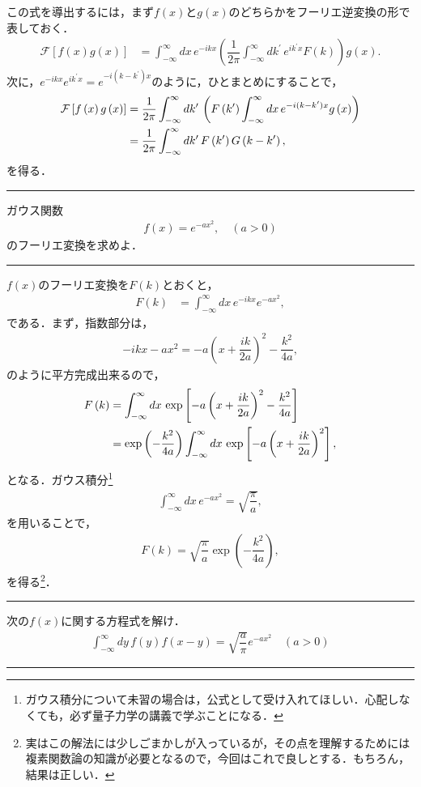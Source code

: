 この式を導出するには，まず$f(x)$と$g(x)$のどちらかをフーリエ逆変換の形で表しておく．
\begin{align}
  \mathcal{F}\left[f\left(x\right)g\left(x\right)\right]
  &= \int_{-\infty}^{\infty}dx\,e^{-ikx}\left(\dfrac{1}{2\pi}\int_{-\infty}^{\infty}dk^{\prime}\,e^{ik^{\prime}x}F\left(k\right)\right)g\left(x\right). 
\end{align}
次に，$e^{-ikx}e^{ik^{\prime}x} = e^{-i(k-k^{\prime})x}$のように，ひとまとめにすることで，
\begin{align}
  \mathcal{F}\left[f\left(x\right)g\left(x\right)\right]
  &= \dfrac{1}{2\pi}\int_{-\infty}^{\infty}dk^{\prime}\,\left(F\left(k^{\prime}\right)\int_{-\infty}^{\infty}dx\,e^{-i(k-k^\prime)x}g\left(x\right)\right) \notag \\
  &= \dfrac{1}{2\pi}\int_{-\infty}^{\infty}dk^{\prime}\,F\left(k^{\prime}\right)G\left(k-k^{\prime}\right),
\end{align}
を得る．
%
\newpage
\hrule
\reidai
ガウス関数
\begin{align}
  f\left(x\right) = e^{-ax^2}, \quad (a>0)
\end{align}
のフーリエ変換を求めよ．
\vspace*{.2cm}
\hrule
\vspace*{.2cm}
%
$f(x)$のフーリエ変換を$F(k)$とおくと，
\begin{align}
 F(k) & = \int_{-\infty}^{\infty}dx\, e^{-ikx}e^{-ax^2},
\end{align}
である．まず，指数部分は，
\begin{align}
 -ikx - ax^2 = -a\left(x+\dfrac{ik}{2a}\right)^2 -\dfrac{k^2}{4a}, 
\end{align}
のように平方完成出来るので，
\begin{align}
  F\left(k\right)
  &= \int_{-\infty}^{\infty}dx\,\exp\left[-a\left(x+\dfrac{ik}{2a}\right)^2-\dfrac{k^2}{4a}\right] \notag \\
  &= \exp\left(-\dfrac{k^2}{4a}\right) \int_{-\infty}^{\infty}dx\,\exp\left[-a\left(x+\dfrac{ik}{2a}\right)^2\right], 
\end{align}
となる．ガウス積分\footnote{ガウス積分について未習の場合は，公式として受け入れてほしい．心配しなくても，必ず量子力学の講義で学ぶことになる．}
\begin{align}
 \int_{-\infty}^{\infty}dx\,e^{-ax^2} = \sqrt{\dfrac{\pi}{a}}, 
\end{align}
を用いることで，
\begin{align}
  F\left(k\right) = \sqrt{\dfrac{\pi}{a}}\exp\left(-\dfrac{k^2}{4a}\right), 
\end{align}
を得る\footnote{実はこの解法には少しごまかしが入っているが，その点を理解するためには複素関数論の知識が必要となるので，今回はこれで良しとする．もちろん，結果は正しい．}．
%
\newpage
\hrule
\reidai
次の$f(x)$に関する方程式を解け．
\begin{align}
  \int_{-\infty}^{\infty}dy\,f(y)f(x-y) = \sqrt{\dfrac{a}{\pi}}e^{-ax^2} \quad (a>0) 
\end{align}
\hrule
\vspace*{.2cm}

